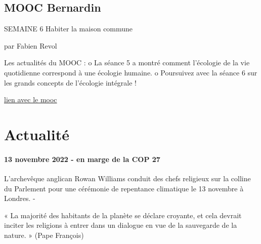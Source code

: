         
\subsection{MOOC Bernardin}

 	SEMAINE 6
Habiter la maison commune
 
par Fabien Revol

	Les actualités du MOOC :
o	La séance 5 a montré comment l'écologie de la vie quotidienne correspond à une écologie humaine.
o	Poursuivez avec la séance 6 sur les grands concepts de l'écologie intégrale !

\href{https://www.lecampusdesbernardins.fr/resource/26/?utm_source=sendinblue&utm_campaign=20221107_NL_MOOC_sans_dons&utm_medium=email}{lien avec le mooc}

\section{Actualité}
\paragraph{13 novembre 2022 - en marge de la COP 27}
L’archevêque anglican Rowan Williams conduit des chefs religieux sur la colline du Parlement pour une cérémonie de repentance climatique le 13 novembre à Londres. -
 
\begin{singlequote}
    « La majorité des habitants de la planète se déclare croyante, et cela devrait inciter les religions à entrer dans un dialogue en vue de la sauvegarde de la nature. » (Pape François)
\end{singlequote}
